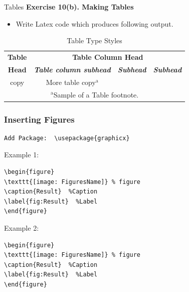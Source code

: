\documentclass [9pt] {beamer}
\begin{document}
\begin{frame}{Tables}
\textbf{Exercise 10(b). Making Tables}\\[.30cm]
\begin{itemize}
	\item Write Latex code which produces following output.
\end{itemize}
\begin{table}[htbp]
	\caption{Table Type Styles}
	\begin{center}
		\begin{tabular}{|c|c|c|c|}
			\hline
			\textbf{Table}&\multicolumn{3}{|c|}{\textbf{Table Column Head}} \\
			\cline{2-4} 
			\textbf{Head} & \textbf{\textit{Table column subhead}}& \textbf{\textit{Subhead}}& \textbf{\textit{Subhead}} \\
			\hline
			copy& More table copy$^{\mathrm{a}}$& &  \\
			\hline
			\multicolumn{4}{c}{$^{\mathrm{a}}$Sample of a Table footnote.}
		\end{tabular}
		\label{tab1}
	\end{center}
\end{table}
\end{frame}


\begin{frame}[fragile]\frametitle{Inserting Figures}
\rm
\fontsize{9pt}{11pt}\selectfont

\begin{verbatim}
Add Package:  \usepackage{graphicx}
\end{verbatim}
Example 1:
{\color{red}
\begin{verbatim}
\begin{figure}
\texttt{[image: FiguresName]} % figure
\caption{Result}  %Caption
\label{fig:Result}  %Label
\end{figure}
\end{verbatim}
}
Example 2:
{\color{red}
\begin{verbatim}
\begin{figure}
\texttt{[image: FiguresName]} % figure
\caption{Result}  %Caption
\label{fig:Result}  %Label
\end{figure}
\end{verbatim}
}
\end{frame}
\end{document}
